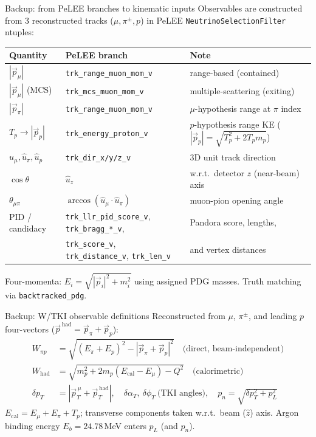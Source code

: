 \documentclass[aspectratio=169,10pt]{beamer}
\begin{document}
{\begin{frame}{Backup: from PeLEE branches to kinematic inputs}
  \footnotesize
  Observables are constructed from 3 reconstructed tracks ($\mu, \pi^\pm, p$) in PeLEE \texttt{NeutrinoSelectionFilter} ntuples:
  \begin{center}\scriptsize
  \begin{tabular}{lll}
  \toprule
  Quantity & PeLEE branch & Note\\\midrule
  $|\vec p_\mu|$      & \texttt{trk\_range\_muon\_mom\_v} & range-based (contained)\\
  $|\vec p_\mu|$ (MCS) & \texttt{trk\_mcs\_muon\_mom\_v} & multiple-scattering (exiting)\\
  $|\vec p_\pi|$      & \texttt{trk\_range\_muon\_mom\_v} & $\mu$-hypothesis range at $\pi$ index\\
  $T_p \to |\vec p_p|$ & \texttt{trk\_energy\_proton\_v} & $p$-hypothesis range KE ($|\vec p_p|=\sqrt{T_p^2+2T_pm_p}$)\\
  $\hat u_{\mu},\hat u_{\pi},\hat u_{p}$ & \texttt{trk\_dir\_x/y/z\_v} & 3D unit track direction\\
  $\cos\theta$        & $\hat u_z$ & w.r.t.\ detector $z$ (near-beam) axis\\
  $\theta_{\mu\pi}$   & $\arccos(\hat u_\mu\!\cdot\!\hat u_\pi)$ & muon-pion opening angle\\
  PID / candidacy     & \texttt{trk\_llr\_pid\_score\_v}, \texttt{trk\_bragg\_*\_v}, & Pandora score, lengths, \\
                      & \texttt{trk\_score\_v}, \texttt{trk\_distance\_v}, \texttt{trk\_len\_v} & and vertex distances\\
  \bottomrule
  \end{tabular}
  \end{center}
  {\scriptsize Four-momenta: $E_i=\sqrt{|\vec p_i|^2+m_i^2}$ using assigned PDG masses. Truth matching via \texttt{backtracked\_pdg}.}
\end{frame}

\begin{frame}{Backup: W/TKI observable definitions}
  \small Reconstructed from $\mu$, $\pi^\pm$, and leading $p$ four-vectors ($\vec p^{\,\mathrm{had}}=\vec p_\pi+\vec p_p$):
  \begin{align*}
  W_{\pi p} &= \sqrt{(E_\pi+E_p)^2-|\vec p_\pi+\vec p_p|^2}\quad\text{(direct, beam-independent)}\\
  W_\mathrm{had} &= \sqrt{m_p^2+2m_p(E_\mathrm{cal}-E_\mu)-Q^2}\quad\text{(calorimetric)}\\
  \delta p_T &= |\vec p_T^{\,\mu}+\vec p_T^{\,\mathrm{had}}|,\quad
  \delta\alpha_T,\ \delta\phi_T\ \text{(TKI angles)},\quad p_n=\sqrt{\delta p_T^2+p_L^2}
  \end{align*}
  {\footnotesize $E_\mathrm{cal}=E_\mu+E_\pi+T_p$; transverse components taken w.r.t.\ beam ($\hat z$) axis. Argon binding energy $E_b=24.78$\,MeV enters $p_L$ (and $p_n$).}
\end{frame}

}
\end{document}
